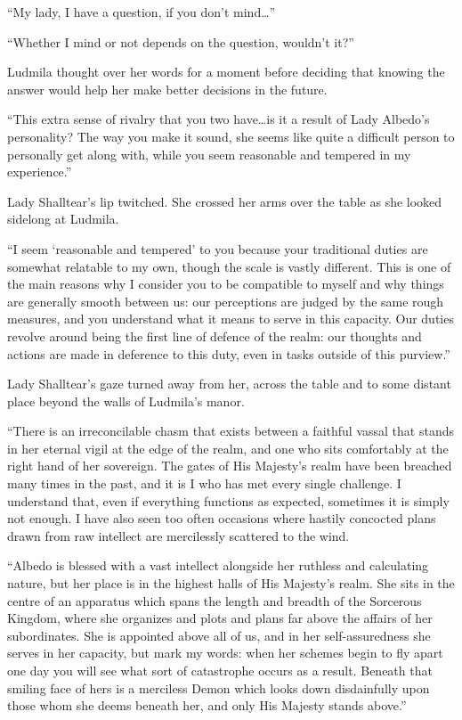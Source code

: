  

“My lady, I have a question, if you don’t mind…”

 

“Whether I mind or not depends on the question, wouldn’t it?”

 

Ludmila thought over her words for a moment before deciding that knowing the answer would help her make better decisions in the future.

 

“This extra sense of rivalry that you two have…is it a result of Lady Albedo’s personality? The way you make it sound, she seems like quite a difficult person to personally get along with, while you seem reasonable and tempered in my experience.”

 

Lady Shalltear’s lip twitched. She crossed her arms over the table as she looked sidelong at Ludmila.

 

“I seem ‘reasonable and tempered’ to you because your traditional duties are somewhat relatable to my own, though the scale is vastly different. This is one of the main reasons why I consider you to be compatible to myself and why things are generally smooth between us: our perceptions are judged by the same rough measures, and you understand what it means to serve in this capacity. Our duties revolve around being the first line of defence of the realm: our thoughts and actions are made in deference to this duty, even in tasks outside of this purview.”

 

Lady Shalltear’s gaze turned away from her, across the table and to some distant place beyond the walls of Ludmila’s manor.

 

“There is an irreconcilable chasm that exists between a faithful vassal that stands in her eternal vigil at the edge of the realm, and one who sits comfortably at the right hand of her sovereign. The gates of His Majesty’s realm have been breached many times in the past, and it is I who has met every single challenge. I understand that, even if everything functions as expected, sometimes it is simply not enough. I have also seen too often occasions where hastily concocted plans drawn from raw intellect are mercilessly scattered to the wind.

 

“Albedo is blessed with a vast intellect alongside her ruthless and calculating nature, but her place is in the highest halls of His Majesty’s realm. She sits in the centre of an apparatus which spans the length and breadth of the Sorcerous Kingdom, where she organizes and plots and plans far above the affairs of her subordinates. She is appointed above all of us, and in her self-assuredness she serves in her capacity, but mark my words: when her schemes begin to fly apart one day you will see what sort of catastrophe occurs as a result. Beneath that smiling face of hers is a merciless Demon which looks down disdainfully upon those whom she deems beneath her, and only His Majesty stands above.”

